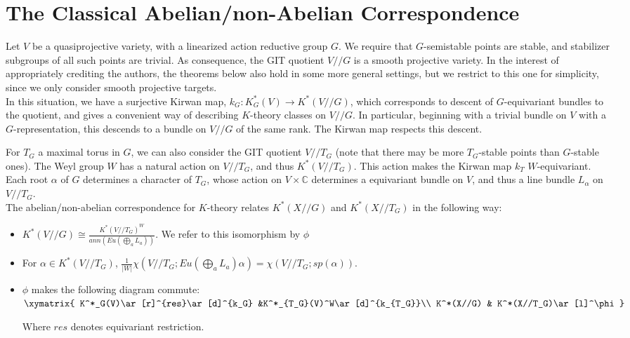 \documentclass[11pt,letterpaper]{amsart}
\begin{document}
\section{The Classical Abelian/non-Abelian Correspondence}

 Let $V$ be a quasiprojective variety, with a linearized action reductive group $G$. We require that $G$-semistable points are stable, and stabilizer subgroups of all such points are trivial. As consequence, the GIT quotient $V//G$ is a smooth projective variety. In the interest of appropriately crediting the authors, the theorems below also hold in some more general settings, but we restrict to this one for simplicity, since we only consider smooth projective targets. \\

 In this situation, we have a surjective Kirwan map, $k_G:K_G^*(V)\to K^*(V//G)$, which corresponds to descent of $G$-equivariant bundles to the quotient, and gives a convenient way of describing $K$-theory classes on $V//G$. In particular, beginning with a trivial bundle on $V$ with a $G$-representation, this descends to a bundle on $V//G$ of the same rank. The Kirwan map respects this descent. 

For $T_G$ a maximal torus in $G$, we can also consider the GIT quotient $V//T_G$ (note that there may be more $T_G$-stable points than $G$-stable ones). The Weyl group $W$ has a natural action on $V//T_G$, and thus $K^*(V//T_G)$. This action makes the Kirwan map $k_T$ $W$-equivariant. Each root $\alpha$ of $G$ determines a character of $T_G$, whose action on $V\times \mathbb{C}$ determines a equivariant bundle on $V$, and thus a line bundle $L_\alpha$ on $V//T_G$. \\


 The abelian/non-abelian correspondence for $K$-theory relates $K^*(X//G)$ and $K^*(X//T_G)$ in the following way:

\begin{thm}
\hfill
\begin{itemize}
\item $K^*(V//G)\cong \frac{K^*(V//T_G)^W}{ann(Eu(\bigoplus_a L_a))}$. We refer to this isomorphism by $\phi$
\item For $\alpha\in K^*(V//T_G)$, $\frac{1}{|W|}\chi(V//T_G;Eu(\bigoplus_a L_a)\alpha)=\chi(V//T_G; sp(\alpha))$.
\item $\phi$ makes the following diagram commute:
$
\xymatrix{
K^*_G(V)\ar[r]^{res}\ar[d]^{k_G} &K^*_{T_G}(V)^W\ar[d]^{k_{T_G}}\\ K^*(X//G) & K^*(X//T_G)\ar[l]^\phi}$

Where $res$ denotes equivariant restriction. 
\end{itemize}

\end{thm}
\end{document}
